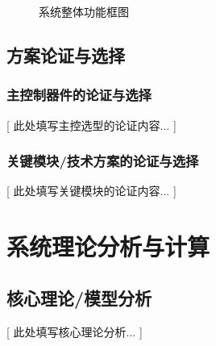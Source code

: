 \documentclass[UTF8,zihao=-4]{ctexart}
\begin{document}
\begin{figure}[H]
	\centering
	\caption{系统整体功能框图}
	\label{fig:system_block}
\end{figure}

\subsection{方案论证与选择}
\subsubsection{主控制器件的论证与选择}
    [ 此处填写主控选型的论证内容... ]

\subsubsection{关键模块/技术方案的论证与选择}
    [ 此处填写关键模块的论证内容... ]

\section{系统理论分析与计算}
\subsection{核心理论/模型分析}
    [ 此处填写核心理论分析... ]
    
    
\end{document}
